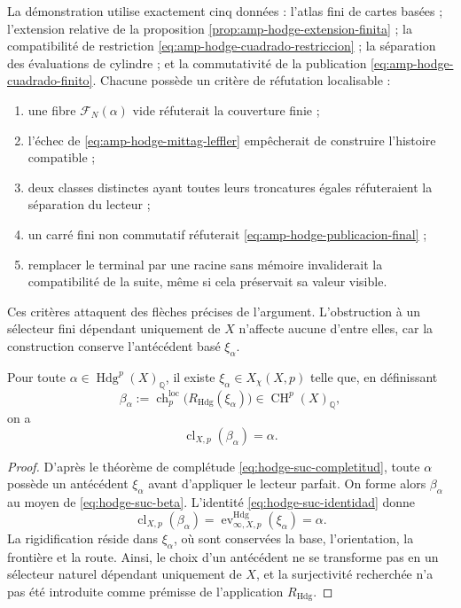 La démonstration utilise exactement cinq données : l'atlas fini de cartes
basées ; l'extension relative de la proposition
\ref{prop:amp-hodge-extension-finita} ; la compatibilité de restriction
\eqref{eq:amp-hodge-cuadrado-restriccion} ; la séparation des évaluations de
cylindre ; et la commutativité de la publication
\eqref{eq:amp-hodge-cuadrado-finito}. Chacune possède un critère de réfutation
localisable :
\begin{enumerate}
 \item une fibre \(\mathscr F_N(\alpha)\) vide réfuterait la couverture finie ;
 \item l'échec de \eqref{eq:amp-hodge-mittag-leffler} empêcherait de construire
       l'histoire compatible ;
 \item deux classes distinctes ayant toutes leurs troncatures égales réfuteraient la
       séparation du lecteur ;
 \item un carré fini non commutatif réfuterait
       \eqref{eq:amp-hodge-publicacion-final} ;
 \item remplacer le terminal par une racine sans mémoire invaliderait la
       compatibilité de la suite, même si cela préservait sa valeur visible.
\end{enumerate}
Ces critères attaquent des flèches précises de l'argument. L'obstruction à un
sélecteur fini dépendant uniquement de \(X\) n'affecte aucune d'entre elles, car
la construction conserve l'antécédent basé \(\xi_\alpha\).

\begin{theorem}
\label{thm:hodge-suc-generacion}
Pour toute \(\alpha\in\operatorname{Hdg}^{p}(X)_{\mathbb Q}\), il existe
\(\xi_{\alpha}\in X_{\chi}(X,p)\) telle que, en définissant
\begin{equation}\label{eq:hodge-suc-beta}
 \beta_{\alpha}:=
 \operatorname{ch}^{\mathrm{loc}}_{p}
 \bigl(R_{\mathrm{Hdg}}(\xi_{\alpha})\bigr)
 \in\operatorname{CH}^{p}(X)_{\mathbb Q},
\end{equation}
on a
\begin{equation}\label{eq:hodge-suc-cl-beta}
 \operatorname{cl}_{X,p}(\beta_{\alpha})=\alpha.
\end{equation}
\end{theorem}

\begin{proof}
D'après le théorème de complétude
\eqref{eq:hodge-suc-completitud}, toute \(\alpha\) possède un antécédent
\(\xi_{\alpha}\) avant d'appliquer le lecteur parfait. On forme alors
\(\beta_{\alpha}\) au moyen de \eqref{eq:hodge-suc-beta}. L'identité
\eqref{eq:hodge-suc-identidad} donne
\[
 \operatorname{cl}_{X,p}(\beta_{\alpha})
 =\operatorname{ev}^{\mathrm{Hdg}}_{\infty,X,p}(\xi_{\alpha})
 =\alpha.
\]
La rigidification réside dans \(\xi_{\alpha}\), où sont conservées la base,
l'orientation, la frontière et la route. Ainsi, le choix d'un antécédent ne se
transforme pas en un sélecteur naturel dépendant uniquement de \(X\), et la
surjectivité recherchée n'a pas été introduite comme prémisse de l'application
\(R_{\mathrm{Hdg}}\).
\end{proof}

